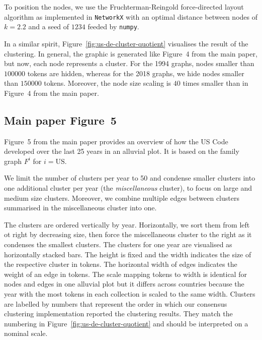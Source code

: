 \begin{table}[H]
	\centering
	
	\caption{Minimal and maximal values of the raw data for each graph in Figure~4 from the main paper %
		and Figure~\ref{fig:us-de-cluster-quotient}.
		The opacity of arrows is scaled based on the edge weight extrema.
	}
	\label{tab:us-de-quotient-min-max}
\end{table}

To position the nodes, we use the Fruchterman-Reingold force-directed layout algorithm as implemented in \texttt{NetworkX} with an optimal distance between nodes of $k=2.2$ and a seed of $1234$ feeded by \texttt{numpy}.

In a similar spirit, Figure~\ref{fig:us-de-cluster-quotient} visualises the result of the clustering.
In general, the graphic is generated like Figure~4 from the main paper, %
but now, each node represents a cluster.
For the 1994 graphs, 
nodes smaller than $100000$ tokens are hidden, 
whereas for the 2018 graphs, 
we hide nodes smaller than $150000$ tokens.
Moreover, the node size scaling is $40$ times smaller than in Figure~4 from the main paper.%

\subsection{Main paper Figure~5} %

Figure~5 from the main paper %
provides an overview of how the US Code developed over the last 25 years in an alluvial plot.
It is based on the family graph $F^i$ for $i=\text{US}$.

We limit the number of clusters per year to 50 and condense smaller clusters into one additional cluster per year (the \emph{miscellaneous} cluster),
to focus on large and medium size clusters.
Moreover, we combine multiple edges between clusters summarised in the miscellaneous cluster into one.

The clusters are ordered vertically by year.
Horizontally, we sort them from left ot right by decreasing size, 
then force the miscellaneous cluster to the right as it condenses the smallest clusters.
The clusters for one year are visualised as horizontally stacked bars.
The height is fixed and the width indicates the size of the respective cluster in tokens.
The horizontal width of edges indicates the weight of an edge in tokens.
The scale mapping tokens to width is identical for nodes and edges in one alluvial plot but it differs across countries
because the year with the most tokens in each collection is scaled to the same width.
Clusters are labelled by numbers that represent the order in which our consensus clustering implementation reported the clustering results.
They match the numbering in Figure~\ref{fig:us-de-cluster-quotient} and should be interpreted on a nominal scale.

